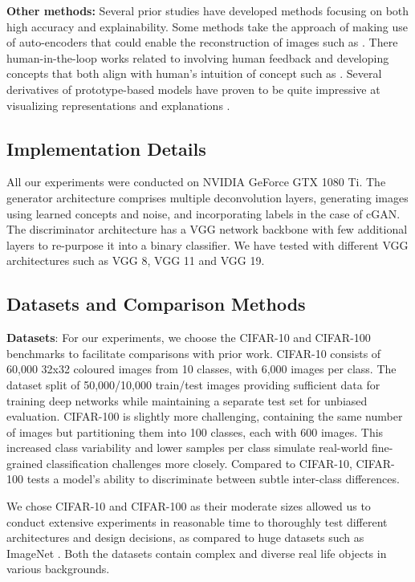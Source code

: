 \documentclass[letterpaper]{article}
\begin{document}
\textbf{Other methods: } Several prior studies have developed methods focusing on both high accuracy and explainability. Some methods take the approach of making use of auto-encoders that could enable the reconstruction of images such as \cite{efros2}. There human-in-the-loop works related to involving human feedback and developing concepts that both align with human's intuition of concept such as \cite{concept_human}. Several derivatives of prototype-based models have proven to be quite impressive at visualizing representations and explanations \cite{prototype}.

\subsection{Implementation Details}
All our experiments were conducted on NVIDIA GeForce GTX 1080 Ti. The generator architecture comprises multiple deconvolution layers, generating images using learned concepts and noise, and incorporating labels in the case of cGAN. The discriminator architecture has a VGG network backbone with few additional layers to re-purpose it into a binary classifier. We have tested with different VGG \cite{VGG} architectures such as VGG 8, VGG 11 and VGG 19. 


\subsection{Datasets and Comparison Methods}\label{sec:data_noise}

\textbf{Datasets}: For our experiments, we choose the CIFAR-10 and CIFAR-100 \cite{CIFAR10} benchmarks to facilitate comparisons with prior work. CIFAR-10 consists of 60,000 32x32 coloured images from 10 classes, with 6,000 images per class. The dataset split of 50,000/10,000 train/test images providing sufficient data for training deep networks while maintaining a separate test set for unbiased evaluation. CIFAR-100 is slightly more challenging, containing the same number of images but partitioning them into 100 classes, each with 600 images. This increased class variability and lower samples per class simulate real-world fine-grained classification challenges more closely. Compared to CIFAR-10, CIFAR-100 tests a model's ability to discriminate between subtle inter-class differences.


We chose CIFAR-10 and CIFAR-100 as their moderate sizes allowed us to conduct extensive experiments in reasonable time to thoroughly test different architectures and design decisions, as compared to huge datasets such as ImageNet \cite{IMAGENET}. Both the datasets contain complex and diverse real life objects in various backgrounds. 
\end{document}
